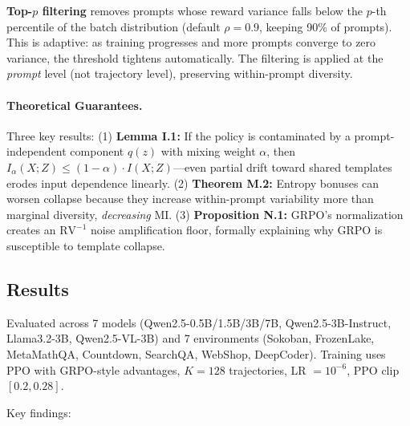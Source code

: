 \documentclass[11pt]{article}
\begin{document}
\textbf{Top-$p$ filtering} removes prompts whose reward variance falls below the $p$-th percentile of the batch distribution (default $\rho = 0.9$, keeping 90\% of prompts). This is adaptive: as training progresses and more prompts converge to zero variance, the threshold tightens automatically. The filtering is applied at the \textit{prompt} level (not trajectory level), preserving within-prompt diversity.

\paragraph{Theoretical Guarantees.}
Three key results: (1) \textbf{Lemma I.1:} If the policy is contaminated by a prompt-independent component $q(z)$ with mixing weight $\alpha$, then $I_\alpha(X;Z) \leq (1-\alpha) \cdot I(X;Z)$---even partial drift toward shared templates erodes input dependence linearly. (2) \textbf{Theorem M.2:} Entropy bonuses can worsen collapse because they increase within-prompt variability more than marginal diversity, \textit{decreasing} MI. (3) \textbf{Proposition N.1:} GRPO's normalization creates an $\mathrm{RV}^{-1}$ noise amplification floor, formally explaining why GRPO is susceptible to template collapse.

\subsection{Results}

Evaluated across 7 models (Qwen2.5-0.5B/1.5B/3B/7B, Qwen2.5-3B-Instruct, Llama3.2-3B, Qwen2.5-VL-3B) and 7 environments (Sokoban, FrozenLake, MetaMathQA, Countdown, SearchQA, WebShop, DeepCoder). Training uses PPO with GRPO-style advantages, $K=128$ trajectories, LR $= 10^{-6}$, PPO clip $[0.2, 0.28]$.

Key findings:
\end{document}

